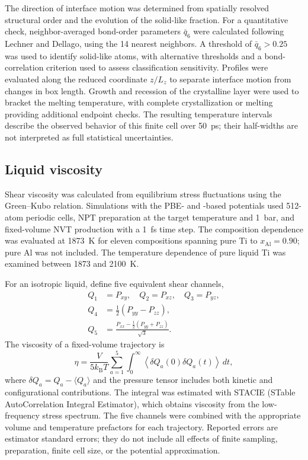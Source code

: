 The direction of interface motion was determined from spatially resolved structural order and the evolution of the solid-like fraction.
For a quantitative check, neighbor-averaged bond-order parameters $\bar q_6$ were calculated following Lechner and Dellago,\cite{Lechner2008} using the 14 nearest neighbors.
A threshold of $\bar q_6>0.25$ was used to identify solid-like atoms, with alternative thresholds and a bond-correlation criterion used to assess classification sensitivity.
Profiles were evaluated along the reduced coordinate $z/L_z$ to separate interface motion from changes in box length.
Growth and recession of the crystalline layer were used to bracket the melting temperature, with complete crystallization or melting providing additional endpoint checks.
The resulting temperature intervals describe the observed behavior of this finite cell over 50~ps; their half-widths are not interpreted as full statistical uncertainties.

\subsection{Liquid viscosity}
\label{sec:viscosity}

Shear viscosity was calculated from equilibrium stress fluctuations using the Green--Kubo relation.
Simulations with the PBE- and \rscan{}-based potentials used 512-atom periodic cells, NPT preparation at the target temperature and 1~bar, and fixed-volume NVT production with a 1~fs time step.
The composition dependence was evaluated at 1873~K for eleven compositions spanning pure Ti to $x_{\mathrm{Al}}=0.90$; pure Al was not included.
The temperature dependence of pure liquid Ti was examined between 1873 and 2100~K.

For an isotropic liquid, define five equivalent shear channels,
\begin{align}
 Q_1&=P_{xy},\quad Q_2=P_{xz},\quad Q_3=P_{yz},\nonumber\\
 Q_4&=\tfrac12(P_{yy}-P_{zz}),\nonumber\\
 Q_5&=\frac{P_{xx}-\tfrac12(P_{yy}+P_{zz})}{\sqrt{3}}.
\end{align}
The viscosity of a fixed-volume trajectory is
\begin{equation}
 \eta=\frac{V}{5k_{\mathrm B}T}\sum_{a=1}^{5}
 \int_0^\infty
 \left\langle\delta Q_a(0)\delta Q_a(t)\right\rangle\,dt,
 \label{eq:viscosity}
\end{equation}
where $\delta Q_a=Q_a-\langle Q_a\rangle$ and the pressure tensor includes both kinetic and configurational contributions.
The integral was estimated with STACIE (STable AutoCorrelation Integral Estimator),\cite{Toraman2025} which obtains viscosity from the low-frequency stress spectrum.
The five channels were combined with the appropriate volume and temperature prefactors for each trajectory.
Reported errors are estimator standard errors; they do not include all effects of finite sampling, preparation, finite cell size, or the potential approximation.

